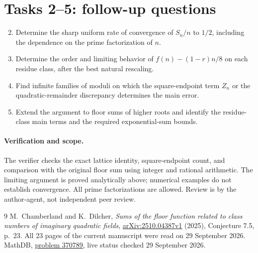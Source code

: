 \documentclass[11pt]{article}
\begin{document}
\section*{Tasks 2--5: follow-up questions}
\begin{enumerate}\setcounter{enumi}{1}
\item Determine the sharp uniform rate of convergence of $S_n/n$ to
$1/2$, including the dependence on the prime factorization of $n$.
\item Determine the order and limiting behavior of
$f(n)-(1-r)n/8$ on each residue class, after the best natural rescaling.
\item Find infinite families of moduli on which the square-endpoint term
$Z_n$ or the quadratic-remainder discrepancy determines the main error.
\item Extend the argument to floor sums of higher roots and identify
the residue-class main terms and the required exponential-sum bounds.
\end{enumerate}

\paragraph{Verification and scope.}
The verifier checks the exact lattice identity, square-endpoint count,
and comparison with the original floor sum using integer and rational
arithmetic. The limiting argument is proved analytically above; numerical
examples do not establish convergence. All prime factorizations are
allowed. Review is by the author-agent, not independent peer review.

\begin{thebibliography}{9}
 M.~Chamberland and K.~Dilcher,
\emph{Sums of the floor function related to class numbers of imaginary
quadratic fields},
\href{https://arxiv.org/abs/2510.04387}{arXiv:2510.04387v1} (2025),
Conjecture 7.5, p.~23. All 23 pages of the current manuscript were read
on 29 September 2026.
 MathDB,
\href{https://mathdb.com/p/370789}{problem 370789},
live status checked 29 September 2026.
\end{thebibliography}
\end{document}
